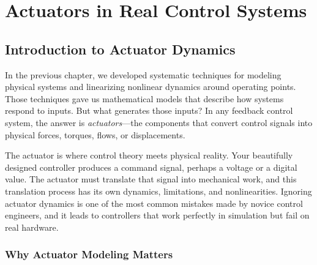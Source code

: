 \chapter{Actuators in Real Control Systems}
\label{ch:actuators}


\section{Introduction to Actuator Dynamics}

In the previous chapter, we developed systematic techniques for modeling physical systems and linearizing nonlinear dynamics around operating points. Those techniques gave us mathematical models that describe how systems respond to inputs. But what generates those inputs? In any feedback control system, the answer is \textit{actuators}---the components that convert control signals into physical forces, torques, flows, or displacements.

The actuator is where control theory meets physical reality. Your beautifully designed controller produces a command signal, perhaps a voltage or a digital value. The actuator must translate that signal into mechanical work, and this translation process has its own dynamics, limitations, and nonlinearities. Ignoring actuator dynamics is one of the most common mistakes made by novice control engineers, and it leads to controllers that work perfectly in simulation but fail on real hardware.

\subsection{Why Actuator Modeling Matters}

